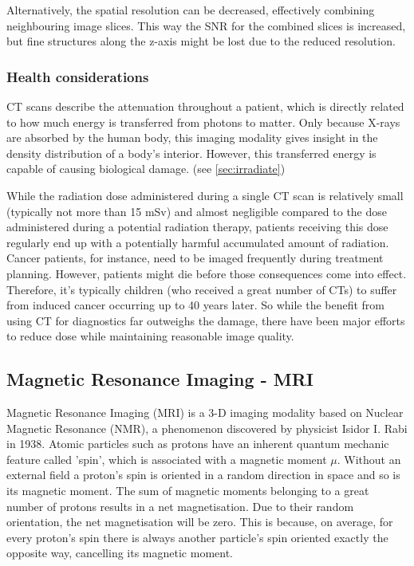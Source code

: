 Alternatively, the spatial resolution can be decreased, effectively combining neighbouring image slices.
This way the SNR for the combined slices is increased, but fine structures along the z-axis might be lost due to the reduced resolution. \cite{Podgorsak, Maidment2014}

\subsubsection{Health considerations}
CT scans describe the attenuation throughout a patient, which is directly related to how much energy is transferred from photons to matter.
Only because X-rays are absorbed by the human body, this imaging modality gives insight in the density distribution of a body's interior.
However, this transferred energy is capable of causing biological damage. (see \ref{sec:irradiate})

While the radiation dose administered during a single CT scan is relatively small (typically not more than 15 mSv) and almost negligible compared to the dose administered during a potential radiation therapy, patients receiving this dose regularly end up with a potentially harmful accumulated amount of radiation.
Cancer patients, for instance, need to be imaged frequently during treatment planning.
However, patients might die before those consequences come into effect.
Therefore, it's typically children (who received a great number of CTs) to suffer from induced cancer occurring up to 40 years later.
So while the benefit from using CT for diagnostics far outweighs the damage, there have been major efforts to reduce dose while maintaining reasonable image quality.
\cite{Murphy2007, Brenner2001, Sodickson2009, Smith2007, McCollough2009, Goldman2013}


\subsection{Magnetic Resonance Imaging - MRI}
\label{sec:MRI}
Magnetic Resonance Imaging (MRI) is a 3-D imaging modality based on Nuclear Magnetic Resonance (NMR), a phenomenon discovered by physicist Isidor I. Rabi in 1938.
Atomic particles such as protons have an inherent quantum mechanic feature called 'spin', which is associated with a magnetic moment $\mu$.
Without an external field a proton's spin is oriented in a random direction in space and so is its magnetic moment.
The sum of magnetic moments belonging to a great number of protons results in a net magnetisation.
Due to their random orientation, the net magnetisation will be zero.
This is because, on average, for every proton's spin there is always another particle's spin oriented exactly the opposite way, cancelling its magnetic moment.

